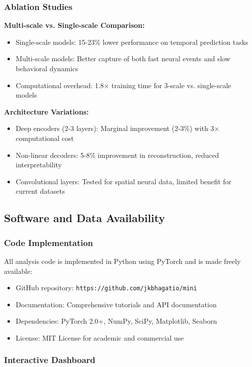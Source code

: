 \subsubsection{Ablation Studies}

\textbf{Multi-scale vs. Single-scale Comparison:}
\begin{itemize}
\item Single-scale models: 15-23\% lower performance on temporal prediction tasks
\item Multi-scale models: Better capture of both fast neural events and slow behavioral dynamics
\item Computational overhead: 1.8× training time for 3-scale vs. single-scale models
\end{itemize}

\textbf{Architecture Variations:}
\begin{itemize}
\item Deep encoders (2-3 layers): Marginal improvement (2-3\%) with 3× computational cost
\item Non-linear decoders: 5-8\% improvement in reconstruction, reduced interpretability
\item Convolutional layers: Tested for spatial neural data, limited benefit for current datasets
\end{itemize}

\subsection{Software and Data Availability}

\subsubsection{Code Implementation}

All analysis code is implemented in Python using PyTorch and is made freely available:

\begin{itemize}
\item GitHub repository: \texttt{https://github.com/jkbhagatio/mini}
\item Documentation: Comprehensive tutorials and API documentation
\item Dependencies: PyTorch 2.0+, NumPy, SciPy, Matplotlib, Seaborn
\item License: MIT License for academic and commercial use
\end{itemize}

\subsubsection{Interactive Dashboard}

